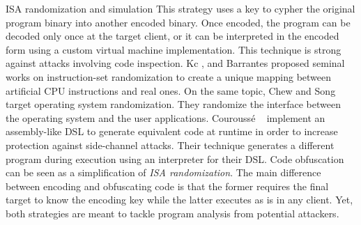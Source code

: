\begin{strategy}{ISA randomization and simulation}
    \label{strategy:S5}
    \normalfont
    This strategy uses a key to cypher the original program binary into another encoded binary. 
    Once encoded, the program can be decoded only once at the target client, or it can be interpreted in the encoded form using a custom virtual machine implementation. This technique is strong against attacks involving code inspection. 
    Kc \etal \cite{Kc03}, and Barrantes \etal \cite{barrantes2003randomized} proposed seminal works on instruction-set randomization 
    to create a unique mapping between artificial CPU instructions and real ones.
    On the same topic, Chew and Song \cite{Chew02mitigatingbuffer} target operating system randomization. They randomize the interface between the operating system and the user applications.
    Courouss{\'e} \etal~\cite{courousse2016runtime} implement an assembly-like DSL to generate equivalent code at runtime in order to increase protection against side-channel attacks. Their technique generates a different program during execution using an interpreter for their DSL.
    Code obfuscation \cite{wobfuscator} can be seen as a simplification of \emph{ISA randomization}. The main difference between encoding and obfuscating code is that the former requires the final target to know the encoding key while the latter executes as is in any client. Yet, both strategies are meant to tackle program analysis from potential attackers. 

    
\end{strategy}

 


